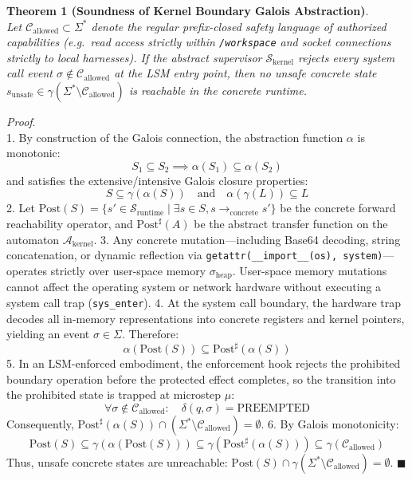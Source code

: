 \documentclass[
  10pt,letterpaper]{article}
\begin{document}
\textbf{Theorem 1 (Soundness of Kernel Boundary Galois Abstraction)}.\\
\emph{Let \(\mathcal{C}_{\text{allowed}} \subset \Sigma^*\) denote the
regular prefix-closed safety language of authorized capabilities
(e.g.~read access strictly within \texttt{/workspace} and socket
connections strictly to local harnesses). If the abstract supervisor
\(\mathcal{S}_{\text{kernel}}\) rejects every system call event
\(\sigma \notin \mathcal{C}_{\text{allowed}}\) at the LSM entry point,
then no unsafe concrete state
\(s_{\text{unsafe}} \in \gamma(\Sigma^* \setminus \mathcal{C}_{\text{allowed}})\)
is reachable in the concrete runtime.}

\emph{Proof}.\\
1. By construction of the Galois connection, the abstraction function
\(\alpha\) is monotonic:
\[S_1 \subseteq S_2 \implies \alpha(S_1) \subseteq \alpha(S_2)\] and
satisfies the extensive/intensive Galois closure properties:
\[S \subseteq \gamma(\alpha(S)) \quad \text{and} \quad \alpha(\gamma(L)) \subseteq L\]
2. Let
\(\text{Post}(S) = \{ s' \in \mathcal{S}_{\text{runtime}} \mid \exists s \in S, s \to_{\text{concrete}} s' \}\)
be the concrete forward reachability operator, and
\(\text{Post}^\sharp(A)\) be the abstract transfer function on the
automaton \(\mathcal{A}_{\text{kernel}}\). 3. Any concrete
mutation---including Base64 decoding, string concatenation, or dynamic
reflection via
\texttt{getattr(\_\_import\_\_(\textquotesingle{}os\textquotesingle{}),\ \textquotesingle{}system\textquotesingle{})}---operates
strictly over user-space memory \(\sigma_{\text{heap}}\). User-space
memory mutations cannot affect the operating system or network hardware
without executing a system call trap (\texttt{sys\_enter}). 4. At the
system call boundary, the hardware trap decodes all in-memory
representations into concrete registers and kernel pointers, yielding an
event \(\sigma \in \Sigma\). Therefore:
\[\alpha(\text{Post}(S)) \subseteq \text{Post}^\sharp(\alpha(S))\] 5.
In an LSM-enforced embodiment, the enforcement hook rejects the
prohibited boundary operation before the protected effect completes, so
the transition into the prohibited state is trapped at microstep
\(\mu\):
\[\forall \sigma \notin \mathcal{C}_{\text{allowed}}: \quad \delta(q, \sigma) = \text{PREEMPTED}\]
Consequently,
\(\text{Post}^\sharp(\alpha(S)) \cap (\Sigma^* \setminus \mathcal{C}_{\text{allowed}}) = \emptyset\).
6. By Galois monotonicity:
\[\text{Post}(S) \subseteq \gamma(\alpha(\text{Post}(S))) \subseteq \gamma(\text{Post}^\sharp(\alpha(S))) \subseteq \gamma(\mathcal{C}_{\text{allowed}})\]
Thus, unsafe concrete states are unreachable:
\(\text{Post}(S) \cap \gamma(\Sigma^* \setminus \mathcal{C}_{\text{allowed}}) = \emptyset\).
\(\blacksquare\)
\end{document}
